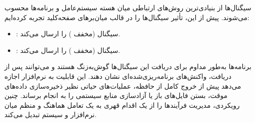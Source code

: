 سیگنال‌ها از بنیادی‌ترین روش‌های ارتباطی میان هسته سیستم‌عامل و برنامه‌ها محسوب می‌شوند. پیش از این، تأثیر سیگنال‌ها را در قالب میان‌برهای صفحه‌کلید تجربه کرده‌ایم:

\begin{itemize}
  \item {}: سیگنال  (مخفف ) را ارسال می‌کند.
  \item {}: سیگنال  (مخفف ) را ارسال می‌کند.
\end{itemize}

برنامه‌ها به‌طور مداوم برای دریافت این سیگنال‌ها گوش‌به‌زنگ هستند و می‌توانند پس از دریافت، واکنش‌های برنامه‌ریزی‌شده‌ای نشان دهند. این قابلیت به نرم‌افزار اجازه می‌دهد پیش از خروج کامل از حافظه، عملیات‌های حیاتی نظیر ذخیره‌سازی داده‌های موقت، بستن فایل‌های باز یا آزادسازی منابع سیستمی را به انجام برساند. چنین رویکردی، مدیریت فرآیندها را از یک اقدام قهری به یک تعامل هماهنگ و منظم میان نرم‌افزار و سیستم تبدیل می‌کند.

